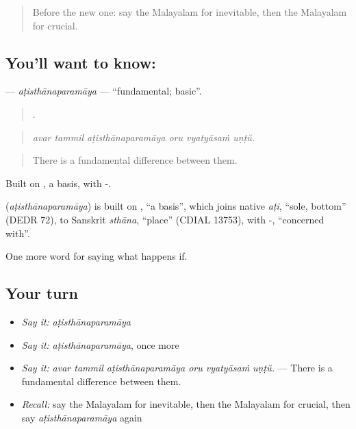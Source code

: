 \label{lesson:ML-C445-atisthanaparamaya}



\begin{quote}
Before the new one: say the Malayalam for inevitable, then the Malayalam for crucial.
\end{quote}

\subsection*{You'll want to know: }
\textbf{} — \emph{aṭisthānaparamāya} — \textquotedblleft{}fundamental; basic\textquotedblright{}.

\begin{quote}
     .
\end{quote}

\begin{quote}
\emph{avar tammil aṭisthānaparamāya oru vyatyāsaṁ uṇṭŭ.}
\end{quote}

\begin{quote}
There is a fundamental difference between them.
\end{quote}

Built on , a basis, with -.

\begin{cousinweb}
\textbf{} (\emph{aṭisthānaparamāya}) is built on , \textquotedblleft{}a basis\textquotedblright{}, which joins native \emph{aṭi}, \textquotedblleft{}sole, bottom\textquotedblright{} (DEDR 72), to Sanskrit \emph{sthāna}, \textquotedblleft{}place\textquotedblright{} (CDIAL 13753), with -, \textquotedblleft{}concerned with\textquotedblright{}.
\end{cousinweb}

\begin{grammarlens}[title={What you've built}]
One more word for saying what happens if.
\end{grammarlens}

\subsection*{Your turn}
\begin{itemize}
\raggedright
  \item \emph{Say it:} \emph{aṭisthānaparamāya}
  \item \emph{Say it:} \emph{aṭisthānaparamāya}, once more
  \item \emph{Say it:} \emph{avar tammil aṭisthānaparamāya oru vyatyāsaṁ uṇṭŭ.} — There is a fundamental difference between them.
  \item \emph{Recall:} say the Malayalam for inevitable, then the Malayalam for crucial, then say \emph{aṭisthānaparamāya} again
\end{itemize}

